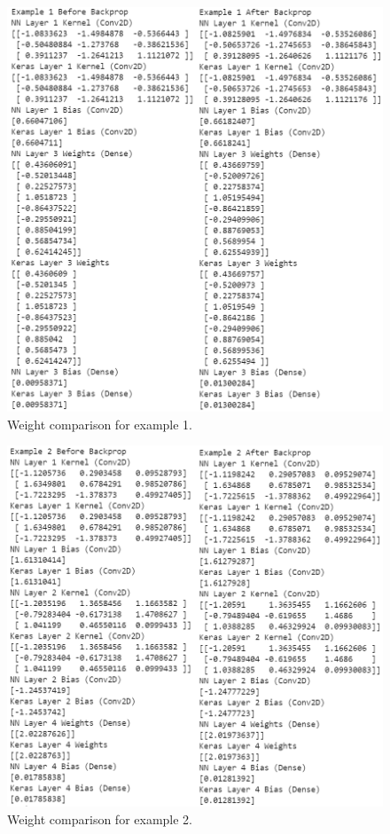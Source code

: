 \documentclass[12pt]{article}
\begin{document}
\begin{figure}
  \centering
  \includegraphics[width=\linewidth]{example-1-weights.png}
  \caption{Weight comparison for example 1.}
  \label{fig:e1}
\end{figure}

\begin{figure}
  \centering
  \includegraphics[width=\linewidth]{example-2-weights.png}
  \caption{Weight comparison for example 2.}
  \label{fig:e2}
\end{figure}
\end{document}
